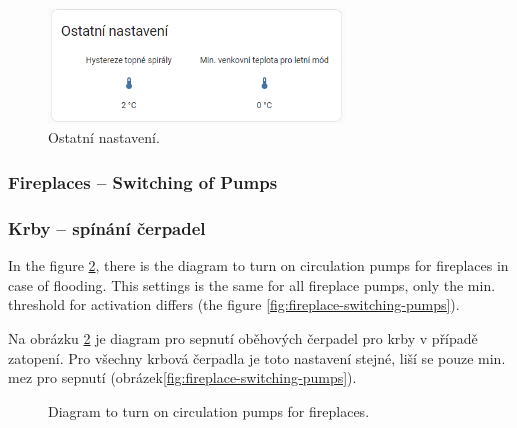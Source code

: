 \begin{Czech}
\begin{figure}[H]
    \centering
    \includegraphics[width=0.7\textwidth]{pictures/czech/software/other-settings.png}
    \caption{Ostatní nastavení.}
    \label{fig:other-settings}
\end{figure}
\end{Czech}


\begin{English}
\subsubsection{Fireplaces – Switching of Pumps}
\end{English}

\begin{Czech}
\subsubsection{Krby – spínání čerpadel}
\end{Czech}


\begin{English}
In the figure \ref{fig:diagram-fireplace}, there is the diagram to turn on circulation pumps for fireplaces in case of flooding. This settings is the same for all fireplace pumps, only the min. threshold for activation differs  (the figure \ref{fig:fireplace-switching-pumps}).
\end{English}

\begin{Czech}
Na obrázku \ref{fig:diagram-fireplace} je diagram pro sepnutí oběhových čerpadel pro krby v případě zatopení. Pro všechny krbová čerpadla je toto nastavení stejné, liší se pouze min. mez pro sepnutí (obrázek\ref{fig:fireplace-switching-pumps}).
\end{Czech}


\begin{English}
\begin{figure}[H]
    \centering
    \def\svgwidth{1\columnwidth}
    \graphicspath{{pictures/czech/software/svg/}}
    
    \caption[]{Diagram to turn on circulation pumps for fireplaces.}
    \label{fig:diagram-fireplace}
\end{figure}
\end{English}

